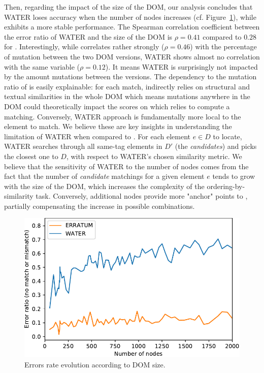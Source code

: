 Then, regarding the impact of the size of the DOM, our analysis concludes that
WATER loses accuracy when the number of nodes increases (cf.
Figure~\ref{fig:nbNodesAccuracy}), while \erratum{} exhibits a more stable
performance. The Spearman correlation coefficient between the error ratio of
WATER and the size of the DOM is $\rho = 0.41$ compared to $0.28$ for \erratum{}.
Interestingly, while \erratum{} correlates rather strongly ($\rho = 0.46$) with the
percentage of mutation between the two DOM versions, WATER shows almost no
correlation with the same variable ($\rho = 0.12$). It means WATER is surprisingly
not impacted by the amount mutations between the versions. The dependency to the
mutation ratio of \erratum{} is easily explainable: for each match, \erratum{}
indirectly relies on structural and textual similarities in the whole DOM which
means mutations anywhere in the DOM could theoretically impact the scores on
which \erratum{} relies to compute a matching. Conversely, WATER approach is
fundamentally more local to the element to match. We believe these are key
insights in understanding the limitation of WATER when compared to \erratum{}.
For each element $e \in D$ to locate, WATER searches through all same-tag elements
in $D'$ (the \textit{candidates}) and picks the closest one to $D$, with respect
to WATER's chosen similarity metric. We believe that the sensitivity of WATER to
the number of nodes comes from the fact that the number of \textit{candidate}
matchings for a given element $e$ tends to grow with the size of the DOM, which
increases the complexity of the ordering-by-similarity task. Conversely,
additional nodes provide more "anchor" points to \erratum, partially
compensating the increase in possible combinations.

\begin{figure}[]
  \centering
  \includegraphics[width=.8\linewidth]{erratum/mutation-numberNodes-mistake}
  \caption{Errors rate evolution according to DOM size.}
  \label{fig:nbNodesAccuracy}
\end{figure}

